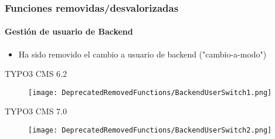 
\begin{frame}[fragile]
	\frametitle{Funciones removidas/desvalorizadas}
	\framesubtitle{Gestión de usuario de Backend}

	\begin{itemize}
		\item Ha sido removido el cambio a usuario de backend ("cambio-a-modo")
	\end{itemize}

	\smaller\tabto{1cm}\begingroup\color{typo3red}TYPO3 CMS 6.2\endgroup\normalsize
	\begin{figure}\vspace{-0.4cm}
		\texttt{[image: DeprecatedRemovedFunctions/BackendUserSwitch1.png]}
	\end{figure}

	\smaller\tabto{1cm}\begingroup\color{typo3red}TYPO3 CMS 7.0\endgroup\normalsize
	\begin{figure}\vspace{-0.4cm}
		\texttt{[image: DeprecatedRemovedFunctions/BackendUserSwitch2.png]}
	\end{figure}

\end{frame}


